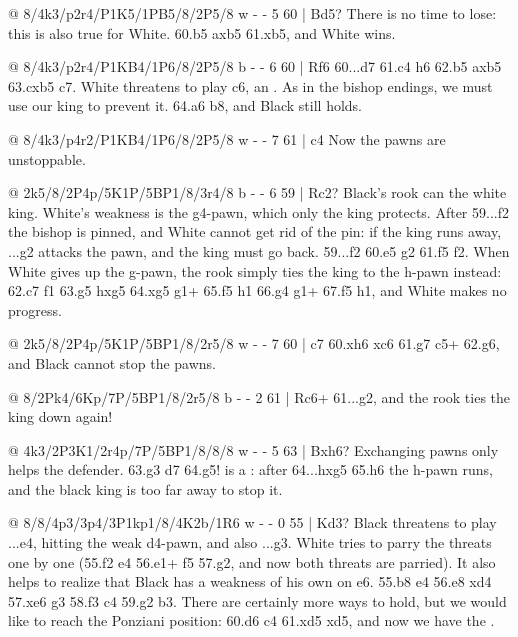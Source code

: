 @ 8/4k3/p2r4/P1K5/1PB5/8/2P5/8 w - - 5 60 | Bd5?
There is no time to lose: this is also true for White. 60.b5 axb5 61.\B xb5, and White wins.

@ 8/4k3/p2r4/P1KB4/1P6/8/2P5/8 b - - 6 60 | Rf6
60...\K d7 61.c4 \R h6 62.b5 axb5 63.cxb5 \K c7. White threatens to play \B c6, an
. As in the bishop endings, we must use our king to
prevent it. 64.a6 \K b8, and Black still holds.

@ 8/4k3/p4r2/P1KB4/1P6/8/2P5/8 w - - 7 61 | c4
Now the pawns are unstoppable.

@ 2k5/8/2P4p/5K1P/5BP1/8/3r4/8 b - - 6 59 | Rc2?
Black's rook can  the white king. White's weakness is
the g4-pawn, which only the king protects. After 59...\R f2 the bishop is pinned, and White cannot
get rid of the pin: if the king runs away, ...\R g2 attacks the pawn, and the king must go back.
59...\R f2 60.\K e5 \R g2 61.\K f5 \R f2. When White gives up the g-pawn, the rook simply ties the
king to the h-pawn instead: 62.c7 \R f1 63.g5 hxg5 64.\K xg5 \R g1+ 65.\K f5 \R h1 66.\K g4 \R g1+
67.\K f5 \R h1, and White makes no progress.

@ 2k5/8/2P4p/5K1P/5BP1/8/2r5/8 w - - 7 60 | c7
60.\B xh6 \R xc6 61.\B g7 \R c5+ 62.\K g6, and Black cannot stop the pawns.

@ 8/2Pk4/6Kp/7P/5BP1/8/2r5/8 b - - 2 61 | Rc6+
61...\R g2, and the rook ties the king down again!

@ 4k3/2P3K1/2r4p/7P/5BP1/8/8/8 w - - 5 63 | Bxh6?
Exchanging pawns only helps the defender.
63.\B g3 \K d7 64.g5! is a : after 64...hxg5 65.h6
the h-pawn runs, and the black king is too far away to stop it.

@ 8/8/4p3/3p4/3P1kp1/8/4K2b/1R6 w - - 0 55 | Kd3?
Black threatens to play ...\K e4, hitting the weak d4-pawn, and also ...g3. White tries to parry
the threats one by one (55.\K f2 \K e4 56.\R e1+ \K f5 57.\K g2, and now both threats are parried).
It also helps to realize that Black has a weakness of his own on e6. 55.\R b8 \K e4 56.\R e8
\K xd4 57.\R xe6 g3 58.\K f3 \K c4 59.\K g2 \K b3. There are certainly more ways to hold, but we
would like to reach the Ponziani position: 60.\R d6 \K c4 61.\R xd5 \K xd5, and now we have the
.

